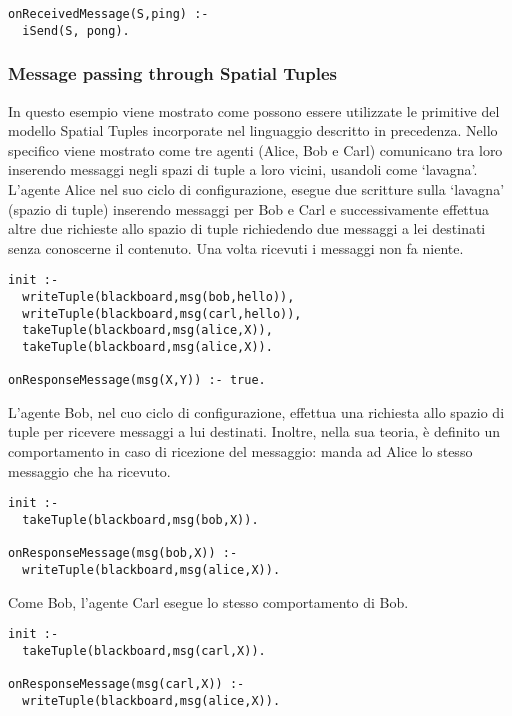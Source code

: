 \medskip
\begin{lstlisting}[firstnumber=1,label={lst:PongAgent},caption={Agente Pong}]
onReceivedMessage(S,ping) :-
  iSend(S, pong).
\end{lstlisting}

\subsubsection{Message passing through Spatial Tuples}
In questo esempio viene mostrato come possono essere utilizzate le primitive del modello Spatial Tuples incorporate nel linguaggio descritto in precedenza. Nello specifico viene mostrato come tre agenti (Alice, Bob e Carl) comunicano tra loro inserendo messaggi negli spazi di tuple a loro vicini, usandoli come `lavagna'.
L'agente Alice nel suo ciclo di configurazione, esegue due scritture sulla `lavagna' (spazio di tuple) inserendo messaggi per Bob e Carl e successivamente effettua altre due richieste allo spazio di tuple richiedendo due messaggi a lei destinati senza conoscerne il contenuto. Una volta ricevuti i messaggi non fa niente.
 
\medskip
\begin{lstlisting}[firstnumber=1,label={lst:Alice},caption={Alice}]
init :-
  writeTuple(blackboard,msg(bob,hello)),
  writeTuple(blackboard,msg(carl,hello)),
  takeTuple(blackboard,msg(alice,X)),
  takeTuple(blackboard,msg(alice,X)).

onResponseMessage(msg(X,Y)) :- true.
\end{lstlisting}

L'agente Bob, nel cuo ciclo di configurazione, effettua una richiesta allo spazio di tuple per ricevere messaggi a lui destinati. Inoltre, nella sua teoria, \`e definito un comportamento in caso di ricezione del messaggio: manda ad Alice lo stesso messaggio che ha ricevuto.
\medskip
\begin{lstlisting}[firstnumber=1,label={lst:Bob},caption={Bob}]
init :-
  takeTuple(blackboard,msg(bob,X)).

onResponseMessage(msg(bob,X)) :-
  writeTuple(blackboard,msg(alice,X)).
\end{lstlisting}

Come Bob, l'agente Carl esegue lo stesso comportamento di Bob.
\medskip
\begin{lstlisting}[firstnumber=1,label={lst:Carl},caption={Carl}]
init :-
  takeTuple(blackboard,msg(carl,X)).

onResponseMessage(msg(carl,X)) :-
  writeTuple(blackboard,msg(alice,X)).
\end{lstlisting}









